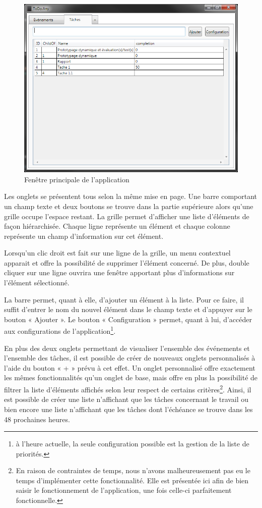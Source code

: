 \documentclass[letterpaper, oneside, 12pt, these, creativecommons]{thETS}
\begin{document}
\begin{figure}
    \includegraphics[scale=0.6]{fenetre_main.png}
    \caption{Fenêtre principale de l'application}
\end{figure}

Les onglets se présentent tous selon la même mise en page. Une barre comportant un champ texte et deux boutons se trouve dans la partie supérieure alors qu'une grille occupe l'espace restant. La grille permet d'afficher une liste d'éléments de façon hiérarchisée. Chaque ligne représente un élément et chaque colonne représente un champ d'information sur cet élément.

Lorsqu'un clic droit est fait sur une ligne de la grille, un menu contextuel apparait et offre la possibilité de supprimer l'élément concerné. De plus, double cliquer sur une ligne ouvrira une fenêtre apportant plus d'informations sur l'élément sélectionné.

La barre permet, quant à elle, d'ajouter un élément à la liste. Pour ce faire, il suffit d'entrer le nom du nouvel élément dans le champ texte et d'appuyer sur le bouton « Ajouter ». Le bouton « Configuration » permet, quant à lui, d'accéder aux configurations de l'application\footnote{à l'heure actuelle, la seule configuration possible est la gestion de la liste de priorités.}.

En plus des deux onglets permettant de visualiser l'ensemble des événements et l'ensemble des tâches, il est possible de créer de nouveaux onglets personnalisés à l'aide du bouton « + » prévu à cet effet. Un onglet personnalisé offre exactement les mêmes fonctionnalités qu'un onglet de base, mais offre en plus la possibilité de filtrer la liste d'éléments affichés selon leur respect de certains critères\footnote{En raison de contraintes de temps, nous n'avons malheureusement pas eu le temps d'implémenter cette fonctionnalité. Elle est présentée ici afin de bien saisir le fonctionnement de l'application, une fois celle-ci parfaitement fonctionnelle.}. Ainsi, il est possible de créer une liste n'affichant que les tâches concernant le travail ou bien encore une liste n'affichant que les tâches dont l'échéance se trouve dans les 48 prochaines heures.
\end{document}

